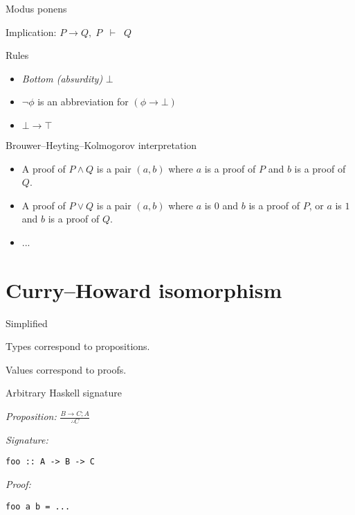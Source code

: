 \documentclass[17pt]{beamer}
\begin{document}
\begin{frame}{Modus ponens}
\begin{center}
Implication: $P \to Q,\; P\;\; \vdash\;\; Q$
\end{center}
\end{frame}

\begin{frame}{Rules}
\begin{itemize}
	\item \emph{Bottom (absurdity)} $\bot$
	\item $\neg \phi$ is an abbreviation for $(\phi \to \bot)$
	\item $\bot \to \top$
\end{itemize}
\end{frame}

\begin{frame}{Brouwer–Heyting–Kolmogorov interpretation}
\begin{itemize}
	\item A proof of $P\wedge Q$ is a pair $(a,b)$ where $a$ is a proof of $P$ and $b$ is a proof of $Q$.
	\item A proof of $P\vee Q$ is a pair $(a,b)$ where $a$ is $0$ and $b$ is a proof of $P$, or $a$ is $1$ and $b$ is a proof of $Q$.
	\item ...
\end{itemize}
\end{frame}

\section{Curry–Howard isomorphism}

\begin{frame}{Simplified}

Types correspond to propositions.

Values correspond to proofs.

\end{frame}

\begin{frame}[fragile]{Arbitrary Haskell signature}

\emph{Proposition:} $\frac{B\to C; A}{\therefore C}$

\emph{Signature:} 
\begin{lstlisting}
foo :: A -> B -> C
\end{lstlisting}

\emph{Proof:}
\begin{lstlisting}
foo a b = ...
\end{lstlisting}


\end{frame}
\end{document}
